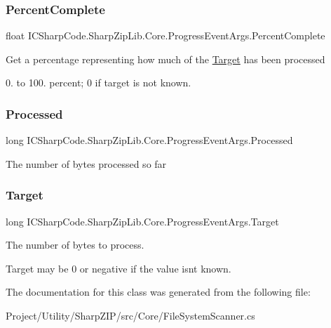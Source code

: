 \subsubsection{\texorpdfstring{Percent\+Complete}{PercentComplete}}
{\footnotesize\ttfamily float I\+C\+Sharp\+Code.\+Sharp\+Zip\+Lib.\+Core.\+Progress\+Event\+Args.\+Percent\+Complete\hspace{0.3cm}{\ttfamily [get]}}



Get a percentage representing how much of the \hyperlink{class_i_c_sharp_code_1_1_sharp_zip_lib_1_1_core_1_1_progress_event_args_a7f328f763763d7715320508ee6177a32}{Target} has been processed 

0. to 100. percent; 0 if target is not known.\mbox{\label{class_i_c_sharp_code_1_1_sharp_zip_lib_1_1_core_1_1_progress_event_args_a7c4956006322b63b3f3b571bf2c0a518}} 
\subsubsection{\texorpdfstring{Processed}{Processed}}
{\footnotesize\ttfamily long I\+C\+Sharp\+Code.\+Sharp\+Zip\+Lib.\+Core.\+Progress\+Event\+Args.\+Processed\hspace{0.3cm}{\ttfamily [get]}}



The number of bytes processed so far 

\mbox{\label{class_i_c_sharp_code_1_1_sharp_zip_lib_1_1_core_1_1_progress_event_args_a7f328f763763d7715320508ee6177a32}} 
\subsubsection{\texorpdfstring{Target}{Target}}
{\footnotesize\ttfamily long I\+C\+Sharp\+Code.\+Sharp\+Zip\+Lib.\+Core.\+Progress\+Event\+Args.\+Target\hspace{0.3cm}{\ttfamily [get]}}



The number of bytes to process. 

Target may be 0 or negative if the value isnt known.

The documentation for this class was generated from the following file\+:\begin{DoxyCompactItemize}
\item 
Project/\+Utility/\+Sharp\+Z\+I\+P/src/\+Core/File\+System\+Scanner.\+cs\end{DoxyCompactItemize}
